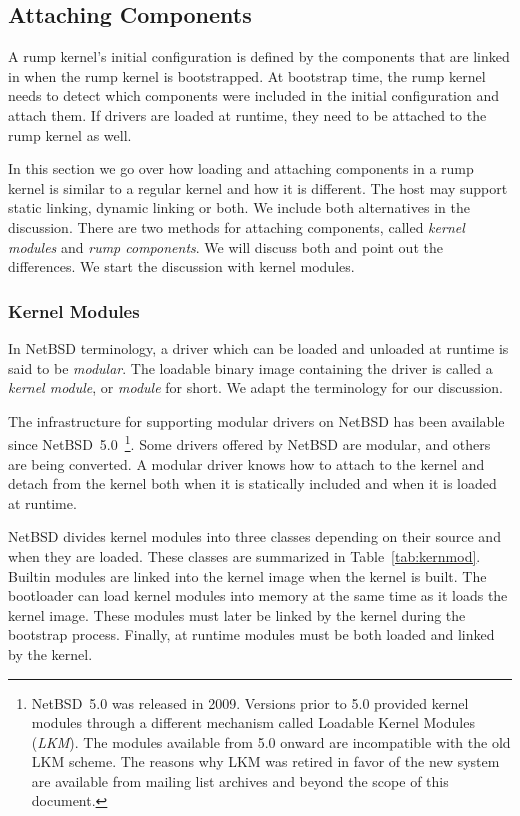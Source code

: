 \subsection{Attaching Components}

A rump kernel's initial configuration is defined by the components that
are linked in when the rump kernel is bootstrapped.  At bootstrap time,
the rump kernel needs to detect which components were included in the
initial configuration and attach them.  If drivers are loaded at runtime,
they need to be attached to the rump kernel as well.

In this section we go over how loading and attaching components in
a rump kernel is similar to a regular kernel and how it is different.
The host may support static linking, dynamic linking or both.  We include
both alternatives in the discussion.  There are two methods for attaching
components, called \textit{kernel modules} and \textit{rump components}.
We will discuss both and point out the differences.  We start the
discussion with kernel modules.

\subsubsection{Kernel Modules}
\label{sect:extending}

In NetBSD terminology, a driver which can be loaded and unloaded
at runtime is said to be \textit{modular}.  The loadable binary
image containing the driver is called a \textit{kernel module}, or
\textit{module} for short.  We adapt the terminology for our
discussion.

The infrastructure for supporting modular drivers on NetBSD has
been available since NetBSD~5.0~\footnote
{
	NetBSD~5.0 was released in 2009.  Versions prior to 5.0
	provided kernel modules through a different mechanism called
	Loadable Kernel Modules (\textit{LKM}).  The modules
	available from 5.0 onward are incompatible with the old
	LKM scheme.  The reasons why LKM was retired in favor of
	the new system are available from mailing list archives
	and beyond the scope of this document.
}.
Some drivers offered by NetBSD are modular, and others are being
converted.  A modular driver knows how to attach to the kernel and detach
from the kernel both when it is statically included and when it is loaded
at runtime.

NetBSD divides kernel modules into three classes depending on their
source and when they are loaded.  These classes are summarized in
Table~\ref{tab:kernmod}.  Builtin modules are linked into the kernel
image when the kernel is built.  The bootloader can load kernel modules
into memory at the same time as it loads the kernel image.  These modules
must later be linked by the kernel during the bootstrap process.  Finally,
at runtime modules must be both loaded and linked by the kernel.

